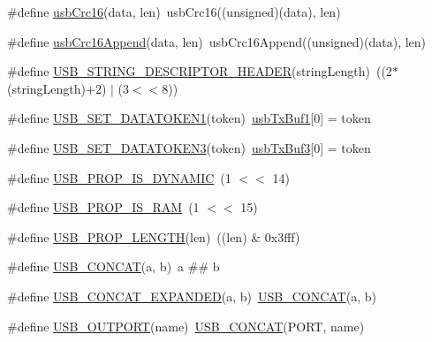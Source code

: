 \begin{DoxyCompactItemize}
\item 
\#define \hyperlink{mhvlib-_vusb-_console_2vusb_2usbdrv_8h_a7111154086ae6bb74946b6c157f3ee83}{usb\-Crc16}(data, len)~usb\-Crc16((unsigned)(data), len)
\item 
\#define \hyperlink{mhvlib-_vusb-_console_2vusb_2usbdrv_8h_a96a513e4c0943ba6bd42aa1289874340}{usb\-Crc16\-Append}(data, len)~usb\-Crc16\-Append((unsigned)(data), len)
\item 
\#define \hyperlink{mhvlib-_vusb-_console_2vusb_2usbdrv_8h_ad94ebd3045d80d1e2ab32c22be4ff96e}{U\-S\-B\-\_\-\-S\-T\-R\-I\-N\-G\-\_\-\-D\-E\-S\-C\-R\-I\-P\-T\-O\-R\-\_\-\-H\-E\-A\-D\-E\-R}(string\-Length)~((2$\ast$(string\-Length)+2) $|$ (3$<$$<$8))
\item 
\#define \hyperlink{mhvlib-_vusb-_console_2vusb_2usbdrv_8h_aca823e3f6e7e9b50d59f00a1099fdcf5}{U\-S\-B\-\_\-\-S\-E\-T\-\_\-\-D\-A\-T\-A\-T\-O\-K\-E\-N1}(token)~\hyperlink{mhvlib-_vusb-_console_2vusb_2usbdrv_8h_a29d78d13efbbb79624fcdaf1d89d594f}{usb\-Tx\-Buf1}\mbox{[}0\mbox{]} = token
\item 
\#define \hyperlink{mhvlib-_vusb-_console_2vusb_2usbdrv_8h_a88a3c0e0377c62f13d123a536a112adf}{U\-S\-B\-\_\-\-S\-E\-T\-\_\-\-D\-A\-T\-A\-T\-O\-K\-E\-N3}(token)~\hyperlink{mhvlib-_vusb-_console_2vusb_2usbdrv_8h_aeb55009b68188072efc4b84e54a881bd}{usb\-Tx\-Buf3}\mbox{[}0\mbox{]} = token
\item 
\#define \hyperlink{mhvlib-_vusb-_console_2vusb_2usbdrv_8h_a25fffb901b71f003f9d90c411f998b36}{U\-S\-B\-\_\-\-P\-R\-O\-P\-\_\-\-I\-S\-\_\-\-D\-Y\-N\-A\-M\-I\-C}~(1 $<$$<$ 14)
\item 
\#define \hyperlink{mhvlib-_vusb-_console_2vusb_2usbdrv_8h_a316a7fbfdf2ffb5155980cb14f93d53d}{U\-S\-B\-\_\-\-P\-R\-O\-P\-\_\-\-I\-S\-\_\-\-R\-A\-M}~(1 $<$$<$ 15)
\item 
\#define \hyperlink{mhvlib-_vusb-_console_2vusb_2usbdrv_8h_a2e2eca50d63fd44256a2d701f579f700}{U\-S\-B\-\_\-\-P\-R\-O\-P\-\_\-\-L\-E\-N\-G\-T\-H}(len)~((len) \& 0x3fff)
\item 
\#define \hyperlink{mhvlib-_vusb-_console_2vusb_2usbdrv_8h_a29b13b1979bf348e1abcaea5baf0e6a4}{U\-S\-B\-\_\-\-C\-O\-N\-C\-A\-T}(a, b)~a \#\# b
\item 
\#define \hyperlink{mhvlib-_vusb-_console_2vusb_2usbdrv_8h_a1dbb59831873ddeb530740995641bf4d}{U\-S\-B\-\_\-\-C\-O\-N\-C\-A\-T\-\_\-\-E\-X\-P\-A\-N\-D\-E\-D}(a, b)~\hyperlink{mhvlib-_vusb-_console_2vusb_2usbdrv_8h_a29b13b1979bf348e1abcaea5baf0e6a4}{U\-S\-B\-\_\-\-C\-O\-N\-C\-A\-T}(a, b)
\item 
\#define \hyperlink{mhvlib-_vusb-_console_2vusb_2usbdrv_8h_a11dc4b4a221259ea8a112cf8b7a8dd5f}{U\-S\-B\-\_\-\-O\-U\-T\-P\-O\-R\-T}(name)~\hyperlink{mhvlib-_vusb-_console_2vusb_2usbdrv_8h_a29b13b1979bf348e1abcaea5baf0e6a4}{U\-S\-B\-\_\-\-C\-O\-N\-C\-A\-T}(P\-O\-R\-T, name)
$$
\end{DoxyCompactItemize}
